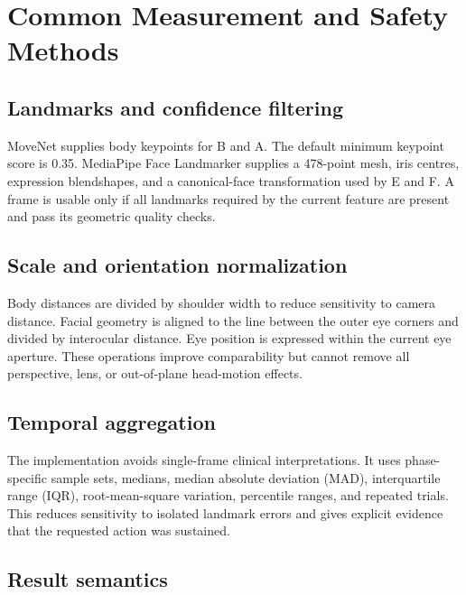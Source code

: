\documentclass[11pt,a4paper]{article}
\begin{document}
\section{Common Measurement and Safety Methods}

\subsection{Landmarks and confidence filtering}

MoveNet supplies body keypoints for B and A. The default minimum keypoint score is 0.35. MediaPipe Face Landmarker supplies a 478-point mesh, iris centres, expression blendshapes, and a canonical-face transformation used by E and F. A frame is usable only if all landmarks required by the current feature are present and pass its geometric quality checks.

\subsection{Scale and orientation normalization}

Body distances are divided by shoulder width to reduce sensitivity to camera distance. Facial geometry is aligned to the line between the outer eye corners and divided by interocular distance. Eye position is expressed within the current eye aperture. These operations improve comparability but cannot remove all perspective, lens, or out-of-plane head-motion effects.

\subsection{Temporal aggregation}

The implementation avoids single-frame clinical interpretations. It uses phase-specific sample sets, medians, median absolute deviation (MAD), interquartile range (IQR), root-mean-square variation, percentile ranges, and repeated trials. This reduces sensitivity to isolated landmark errors and gives explicit evidence that the requested action was sustained.

\subsection{Result semantics}
\end{document}
